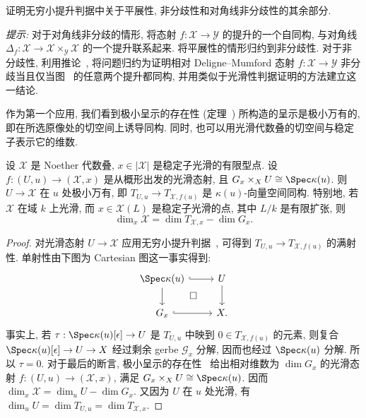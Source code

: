\begin{exercise}\label{src:4.7.5}
证明无穷小提升判据中关于平展性, 非分歧性和对角线非分歧性的其余部分.

\textit{提示:} 对于对角线非分歧的情形, 将态射 $f:\mathcal X\to\mathcal Y$ 的提升的一个自同构, 与对角线 $\Delta_f:\mathcal X\to\mathcal X\times_{\mathcal Y}\mathcal X$ 的一个提升联系起来. 将平展性的情形归约到非分歧性. 对于非分歧性, 利用推论~, 将问题归约为证明相对 Deligne--Mumford 态射 $f:\mathcal X\to\mathcal Y$ 非分歧当且仅当图~ 的任意两个提升都同构, 并用类似于光滑性判据证明的方法建立这一结论.
\end{exercise}
作为第一个应用, 我们看到极小呈示的存在性 (定理~) 所构造的呈示是极小万有的, 即在所选原像处的切空间上诱导同构. 同时, 也可以用光滑代数叠的切空间与稳定子表示它的维数.
\begin{proposition}\label{src:4.7.6}
设 $\mathcal X$ 是 Noether 代数叠, $x\in|\mathcal X|$ 是稳定子光滑的有限型点. 设 $f:(U,u)\to(\mathcal X,x)$ 是从概形出发的光滑态射, 且 $\mathcal G_x\times_{\mathcal X}U\cong\Spec\kappa(u)$. 则 $U\to\mathcal X$ 在 $u$ 处极小万有, 即 $T_{U,u}\to T_{\mathcal X,f(u)}$ 是 $\kappa(u)$-向量空间同构. 特别地, 若 $\mathcal X$ 在域 $k$ 上光滑, 而 $x\in\mathcal X(L)$ 是稳定子光滑的点, 其中 $L/k$ 是有限扩张, 则
\[
\dim_x\mathcal X=\dim T_{\mathcal X,x}-\dim G_x.
\]
\end{proposition}
\begin{proof}
对光滑态射 $U\to\mathcal X$ 应用无穷小提升判据~, 可得到 $T_{U,u}\to T_{\mathcal X,f(u)}$ 的满射性. 单射性由下图为 Cartesian 图这一事实得到:
\[
\begin{tikzcd}
\Spec\kappa(u)\arrow[r,hook]\arrow[d]&U\arrow[d]\\
\mathcal G_x\arrow[r,hook]\arrow[ur,phantom,"\square" description]&\mathcal X.
\end{tikzcd}
\]
事实上, 若 $\tau:\Spec\kappa(u)[\epsilon]\to U$ 是 $T_{U,u}$ 中映到 $0\in T_{\mathcal X,f(u)}$ 的元素, 则复合 $\Spec\kappa(u)[\epsilon]\to U\to\mathcal X$ 经过剩余 gerbe $\mathcal G_x$ 分解, 因而也经过 $\Spec\kappa(u)$ 分解. 所以 $\tau=0$. 对于最后的断言, 极小呈示的存在性~ 给出相对维数为 $\dim G_x$ 的光滑态射 $f:(U,u)\to(\mathcal X,x)$, 满足 $\mathcal G_x\times_{\mathcal X}U\cong\Spec\kappa(u)$. 因而 $\dim_x\mathcal X=\dim_u U-\dim G_x$. 又因为 $U$ 在 $u$ 处光滑, 有 $\dim_u U=\dim T_{U,u}=\dim T_{\mathcal X,x}$.
\end{proof}
